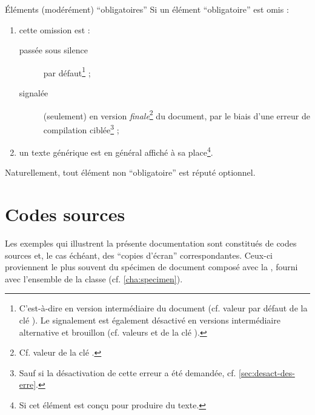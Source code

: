 \begin{dbremark}{Éléments (modérément) \enquote{obligatoires}}{}
  Si un élément \enquote{obligatoire} est omis :
  \begin{enumerate}
  \item cette omission est :
    \begin{description}
    \item[passée sous silence] par défaut\footnote{C'est-à-dire en version
        intermédiaire du document (cf. valeur par défaut 
        de la clé ). Le signalement est également désactivé en
        versions intermédiaire alternative et brouillon (cf. valeurs
         et  de la clé
        ).} ;
    \item[signalée] (seulement) en version \emph{finale}\footnote{Cf. valeur
         de la clé .} du document, par le biais
      d'une erreur de compilation ciblée\footnote{Sauf si la désactivation de
        cette erreur a été demandée, cf. \vref{sec:desact-des-erre}.} ;
    \end{description}
  \item un texte générique est en général affiché à sa place\footnote{Si cet
      élément est conçu pour produire du texte.}.
  \end{enumerate}
\end{dbremark}

Naturellement, tout élément non \enquote{obligatoire} est réputé optionnel.

\section{Codes sources}
\label{sec:codes-sources}

Les exemples qui illustrent la présente documentation sont constitués de codes
sources et, le cas échéant, des \enquote{copies d'écran} correspondantes.
Ceux-ci proviennent le plus souvent du spécimen de document composé avec la
\yatcl, fourni avec l'ensemble de la classe (cf. \vref{cha:specimen}).

